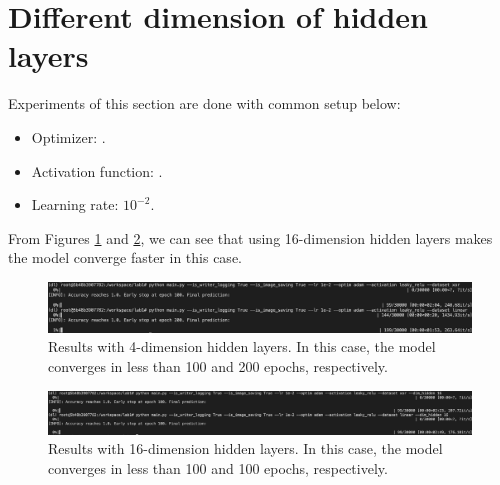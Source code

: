 \section{Different dimension of hidden layers}
\indent
	Experiments of this section are done with common setup below: 
	\begin{itemize}
		\item Optimizer: .
		\item Activation function: .
		\item Learning rate: $10^{-2}$.
	\end{itemize}

	From Figures \ref{result-dim-4} and \ref{result-dim-16}, we can see that 
	using 16-dimension hidden layers makes the model converge faster in this case.
	
	\begin{figure}[H]
		\centering
		\includegraphics[scale=0.3]{img/adam_1e-2_leaky-relu.png}
		\caption{Results with 4-dimension hidden layers. In this case, the model converges in less than 100 and 200 epochs, respectively.}
		\label{result-dim-4}
	\end{figure}
	\begin{figure}[H]
		\centering
		\includegraphics[scale=0.3]{img/adam_1e-2_leaky-relu_16.png}
		\caption{Results with 16-dimension hidden layers. In this case, the model converges in less than 100 and 100 epochs, respectively.}
		\label{result-dim-16}
	\end{figure}

